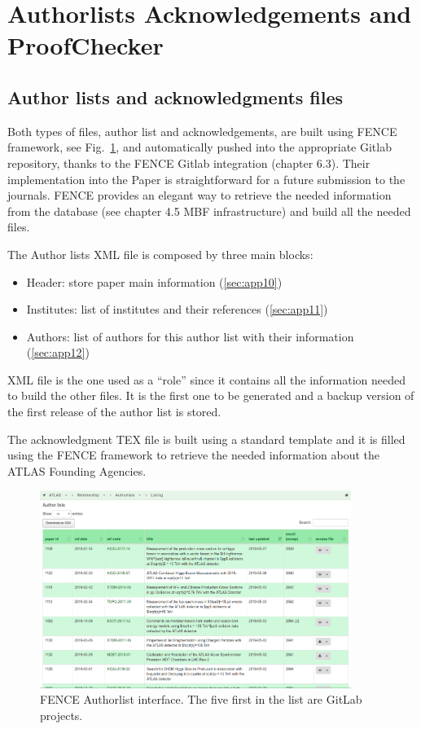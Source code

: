 \section{Authorlists Acknowledgements and ProofChecker}
\label{sec:Authorlists_Acknowledgements_and_ProofChecker}

\subsection{Author lists and acknowledgments files}
\label{sec:Author_lists_and_acknowledgments_files}

Both types of files, author list and acknowledgements, are built using FENCE framework, see Fig.~\ref{fig:authorlist_interface}, and automatically pushed into the appropriate Gitlab repository, thanks to the FENCE Gitlab integration (chapter 6.3). Their implementation into the Paper is straightforward for a future submission to the journals. FENCE provides an elegant way to retrieve the needed information from the database (see chapter 4.5 MBF infrastructure) and build all the needed files.
 
The Author lists XML file is composed by three main blocks:
\begin{itemize}
\item Header: store paper main information (\ref{sec:app10})
\item Institutes: list of institutes and their references (\ref{sec:app11})
\item Authors: list of authors for this author list with their information (\ref{sec:app12})
\end{itemize}
 
XML file is the one used as a “role” since it contains all the information needed to build the other files. It is the first one to be generated and a backup version of the first release of the author list is stored.
 
The acknowledgment TEX file is built using a standard template and it is filled using the FENCE framework to retrieve the needed information about the ATLAS Founding Agencies.

\begin{figure}[ht!]
  \centering
  \includegraphics[width=0.9\textwidth]{figures/authorlist_interface.png}
  \caption{FENCE Authorlist interface. The five first in the list are GitLab projects.}
  \label{fig:authorlist_interface}
\end{figure}

